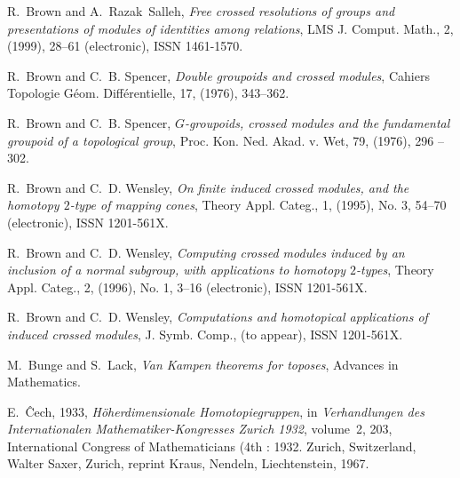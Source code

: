 \documentclass[12pt]{article}
\theoremstyle{plain}
\theoremstyle{definition}
\numberwithin{equation}{section}
\begin{document}
\begin{thebibliography}{99}
R.~Brown and A.~Razak~Salleh, {\em Free crossed resolutions of groups and presentations of modules of identities among relations}, LMS J. Comput.  Math., 2, (1999), 28--61 (electronic), ISSN 1461-1570.

R.~Brown and C.~B. Spencer, {\em Double groupoids and crossed
modules\/}, Cahiers Topologie G\'eom. Diff\'erentielle, 17, (1976), 343--362.

R.~Brown and C.~B. Spencer, {\em $G$-groupoids, crossed modules
and the fundamental groupoid of a topological group}, Proc. Kon. Ned. Akad. v. Wet,
  79, (1976), 296 -- 302.

R.~Brown and C.~D. Wensley, {\em On finite induced crossed modules, and the homotopy {$2$}-type of mapping cones}, Theory Appl. Categ., 1, (1995), No. 3, 54--70 (electronic), ISSN 1201-561X.

R.~Brown and C.~D. Wensley, {\em Computing crossed modules induced by an inclusion of a normal subgroup, with applications to homotopy {$2$}-types},  Theory Appl. Categ., 2, (1996), No. 1, 3--16 (electronic), ISSN 1201-561X.

R.~Brown and C.~D. Wensley, {\em Computations and homotopical
applications of induced crossed modules\/}, J. Symb. Comp.,  (to appear), ISSN 1201-561X.

M.~Bunge and S.~Lack, {\em Van Kampen theorems for toposes}, Advances in Mathematics.

E.~{{\^C}}ech, 1933, {\em H{\"o}herdimensionale
{H}omotopiegruppen\/}, in {\em   Verhandlungen des Internationalen Mathematiker-Kongresses Zurich 1932\/},
volume~2,  203, International Congress of Mathematicians (4th : 1932. Zurich, Switzerland, Walter Saxer, 
Zurich, reprint Kraus, Nendeln, Liechtenstein, 1967.
\end{thebibliography}

\end{document}
